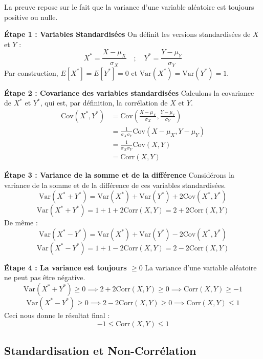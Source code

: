 \begin{proofbox}
La preuve repose sur le fait que la variance d'une variable aléatoire est toujours positive ou nulle.

\textbf{Étape 1 : Variables Standardisées}
\newline
On définit les versions standardisées de $X$ et $Y$ :
$$X^* = \frac{X - \mu_X}{\sigma_X} \quad ; \quad Y^* = \frac{Y - \mu_Y}{\sigma_Y}$$
Par construction, $E[X^*]=E[Y^*]=0$ et $\text{Var}(X^*) = \text{Var}(Y^*) = 1$.

\textbf{Étape 2 : Covariance des variables standardisées}
\newline
Calculons la covariance de $X^*$ et $Y^*$, qui est, par définition, la corrélation de $X$ et $Y$.
\begin{align*}
\text{Cov}(X^*, Y^*) &= \text{Cov}\left( \frac{X - \mu_X}{\sigma_X}, \frac{Y - \mu_Y}{\sigma_Y} \right) \\
&= \frac{1}{\sigma_X \sigma_Y} \text{Cov}(X - \mu_X, Y - \mu_Y) \\
&= \frac{1}{\sigma_X \sigma_Y} \text{Cov}(X, Y) \\
&= \text{Corr}(X,Y)
\end{align*}

\textbf{Étape 3 : Variance de la somme et de la différence}
\newline
Considérons la variance de la somme et de la différence de ces variables standardisées.
$$\text{Var}(X^* + Y^*) = \text{Var}(X^*) + \text{Var}(Y^*) + 2\text{Cov}(X^*, Y^*)$$
$$\text{Var}(X^* + Y^*) = 1 + 1 + 2\text{Corr}(X,Y) = 2 + 2\text{Corr}(X,Y)$$
De même :
$$\text{Var}(X^* - Y^*) = \text{Var}(X^*) + \text{Var}(Y^*) - 2\text{Cov}(X^*, Y^*)$$
$$\text{Var}(X^* - Y^*) = 1 + 1 - 2\text{Corr}(X,Y) = 2 - 2\text{Corr}(X,Y)$$

\textbf{Étape 4 : La variance est toujours $\ge 0$}
\newline
La variance d'une variable aléatoire ne peut pas être négative.
$$\text{Var}(X^* + Y^*) \ge 0 \implies 2 + 2\text{Corr}(X,Y) \ge 0 \implies \text{Corr}(X,Y) \ge -1$$
$$\text{Var}(X^* - Y^*) \ge 0 \implies 2 - 2\text{Corr}(X,Y) \ge 0 \implies \text{Corr}(X,Y) \le 1$$
Ceci nous donne le résultat final :
$$-1 \le \text{Corr}(X,Y) \le 1$$
\end{proofbox}

\subsection{Standardisation et Non-Corrélation}

